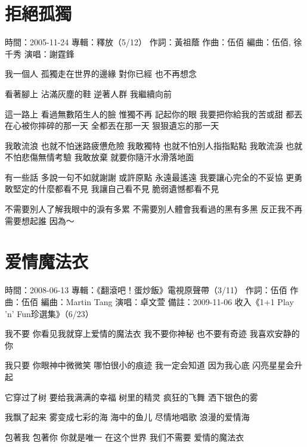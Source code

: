 \documentclass[UTF8,a4paper,oneside,twocolumn,12pt]{ctexbook}
\newcommand{\infopair}[2]{\textbullet #1：#2}
\newcommand{\zc}[1][伍佰]{\infopair{作詞}{#1}}
\newcommand{\zq}[1][伍佰]{\infopair{作曲}{#1}}
\newcommand{\bq}[1][伍佰]{\infopair{編曲}{#1}}
\newcommand{\zj}[1]{\infopair{專輯}{#1}}
\newcommand{\sj}[1]{\infopair{時間}{#1}}
\newcommand{\bz}[1]{\infopair{備註}{#1}}
\newenvironment{info}{\begin{flushleft}\kaishu
	}
	{\end{flushleft}\normalsize\yahei\par}
\newenvironment{lyric}{
	}
{}
\begin{document}
\section{拒絕孤獨}
\begin{info}%
	\sj{2005-11-24}
	\zj{釋放（5/12）}
	\zc[黃祖蔭]
	\zq
	\bq[伍佰, 徐千秀]
	\infopair{演唱}{謝霆鋒}
\end{info}
\begin{lyric}
	我一個人 孤獨走在世界的邊緣
	對你已經 也不再想念

	看著腳上 沾滿灰塵的鞋
	逆著人群 我繼續向前

	這一路上 看過無數陌生人的臉
	惟獨不再 記起你的眼
	我要把你給我的苦或甜
	都丟在心被你摔碎的那一天
	全都丟在那一天 狠狠遺忘的那一天

	我敢流浪 也就不怕迷路疲憊危險
	我敢獨特 也就不怕別人指指點點
	我敢流淚 也就不怕悲傷無情考驗
	我敢放棄 就要你隨汗水滑落地面

	有一些話 多說一句不如就謝謝
	或許原點 永遠最遙遠
	我要讓心完全的不妥協
	更勇敢堅定的什麼都看不見
	我讓自己看不見 脆弱遺憾都看不見

	不需要別人了解我眼中的淚有多累
	不需要別人體會我看過的黑有多黑
	反正我不再需要想起誰 因為～
\end{lyric}

\section{爱情魔法衣}
\begin{info}
	\sj{2008-06-13}
	\zj{《翻滾吧！蛋炒飯》電視原聲帶（3/11）}
	\zc
	\zq
	\bq[Martin Tang]
	\infopair{演唱}{卓文萱}
	\bz{2009-11-06 收入《1+1 Play 'n' Fun珍選集》（6/23）}
\end{info}
\begin{lyric}
	我不要 你看见我就穿上爱情的魔法衣
	我不要你神秘 也不要有奇迹 我喜欢安静的你

	我只要 你眼神中微微笑 哪怕很小的痕迹
	我一定会知道 因为我心底 闪亮星星会升起

	它穿过了树 要给我满满的幸福
	树里的精灵 疯狂的飞舞 洒下银色的雾

	我飘了起来 雾变成七彩的海
	海中的鱼儿 尽情地唱歌 浪漫的爱情海

	包著我 包著你 你就是唯一
	在这个世界 我们不需要 爱情的魔法衣
\end{lyric}
\end{document}
